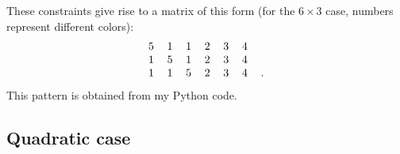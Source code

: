 These constraints give rise to a matrix of this form (for the $6 \times 3$ case, numbers represent different colors):
\begin{equation}
\begin{tabular}{c c c c c c c}
5 & 1 & 1 & 2 & 3 & 4 & \\
1 & 5 & 1 & 2 & 3 & 4 & \\
1 & 1 & 5 & 2 & 3 & 4 & .
\end{tabular} 
\end{equation}This pattern is obtained from my Python code.

\subsection{Quadratic case}

